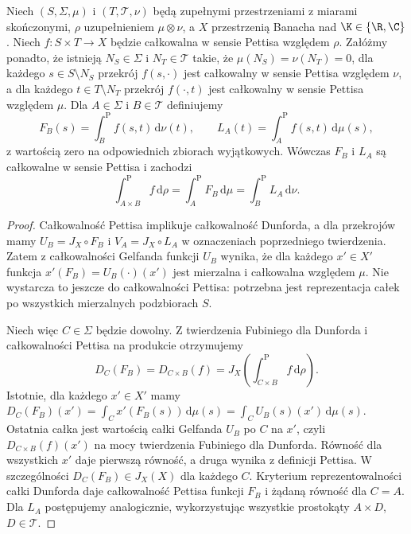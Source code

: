 \begin{twierdzenie}
\label{thm:pettis-fubini15b}
Niech $(S,\Sigma,\mu)$ i $(T,\mathcal T,\nu)$ będą
zupełnymi przestrzeniami z miarami skończonymi,
$\rho$ uzupełnieniem $\mu\otimes\nu$, a $X$ przestrzenią
Banacha nad $\K\in\{\R,\C\}$.
Niech $f:S\times T\to X$ będzie całkowalna w sensie
Pettisa względem $\rho$. Załóżmy ponadto, że istnieją
$N_S\in\Sigma$ i $N_T\in\mathcal T$ takie, że
$\mu(N_S)=\nu(N_T)=0$, dla każdego $s\in S\setminus N_S$
przekrój $f(s,\cdot)$ jest całkowalny w sensie Pettisa
względem $\nu$, a dla każdego $t\in T\setminus N_T$
przekrój $f(\cdot,t)$ jest całkowalny w sensie Pettisa
względem $\mu$.
Dla $A\in\Sigma$ i $B\in\mathcal T$ definiujemy
\[
 F_B(s)=\int_B^{\mathrm P}f(s,t)\,\mathrm d\nu(t),
 \qquad L_A(t)=\int_A^{\mathrm P}f(s,t)\,\mathrm d\mu(s),
\]
z wartością zero na odpowiednich zbiorach wyjątkowych.
Wówczas $F_B$ i $L_A$ są całkowalne w sensie Pettisa
i zachodzi
\[
 \int_{A\times B}^{\mathrm P}f\,\mathrm d\rho
 =\int_A^{\mathrm P}F_B\,\mathrm d\mu
 =\int_B^{\mathrm P}L_A\,\mathrm d\nu.
\]
\end{twierdzenie}
\begin{proof}
Całkowalność Pettisa implikuje całkowalność Dunforda,
a dla przekrojów mamy $U_B=J_X\circ F_B$ i
$V_A=J_X\circ L_A$ w oznaczeniach poprzedniego twierdzenia.
Zatem z całkowalności Gelfanda funkcji $U_B$ wynika,
że dla każdego $x'\in X'$ funkcja
$x'(F_B)=U_B(\cdot)(x')$ jest mierzalna i całkowalna
względem $\mu$. Nie wystarcza to jeszcze do całkowalności
Pettisa: potrzebna jest reprezentacja całek po wszystkich
mierzalnych podzbiorach $S$.

Niech więc $C\in\Sigma$ będzie dowolny. Z twierdzenia
Fubiniego dla Dunforda i całkowalności Pettisa na
produkcie otrzymujemy
\[
 D_C(F_B)=D_{C\times B}(f)
 =J_X\left(\int_{C\times B}^{\mathrm P}f\,\mathrm d\rho\right).
\]
Istotnie, dla każdego $x'\in X'$ mamy
$D_C(F_B)(x')=\int_C x'(F_B(s))\,\mathrm d\mu(s)
=\int_C U_B(s)(x')\,\mathrm d\mu(s)$.
Ostatnia całka jest wartością całki Gelfanda $U_B$
po $C$ na $x'$, czyli $D_{C\times B}(f)(x')$ na mocy
twierdzenia Fubiniego dla Dunforda. Równość dla wszystkich
$x'$ daje pierwszą równość, a druga wynika z definicji Pettisa.
W szczególności $D_C(F_B)\in J_X(X)$ dla każdego $C$.
Kryterium reprezentowalności całki Dunforda daje
całkowalność Pettisa funkcji $F_B$ i żądaną równość
dla $C=A$. Dla $L_A$ postępujemy analogicznie,
wykorzystując wszystkie prostokąty $A\times D$,
$D\in\mathcal T$.
\end{proof}


